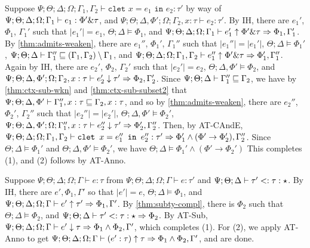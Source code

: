   \item[(T-CAndE)] Suppose
  $\Psi ; \Theta ; \Delta ; \Omega ; \Gamma_1,\Gamma_2 \vdash \texttt{clet } x = e_1 \texttt{ in } e_2 : \tau'$ by way of
  $\Psi ; \Theta ; \Delta ; \Omega ; \Gamma_1 \vdash e_1 : \Phi' \& \tau$, and
  $\Psi ; \Theta ; \Delta, \Phi' ; \Omega ; \Gamma_2, x : \tau \vdash e_2 : \tau'$.
  By IH, there are $e_1'$, $\Phi_1$, $\Gamma_1'$ such that
  $|e_1'| = e_1$,
  $\Theta ; \Delta \vDash \Phi_1$, and
  $\Psi ; \Theta ; \Delta ; \Omega ; \Gamma_1 \vdash e_1' \uparrow \Phi' \& \tau \Rightarrow \Phi_1,\Gamma_1'$.
  By \autoref{thm:admits-weaken}, there are $e_1''$, $\Phi_1'$, $\Gamma_1''$ such that
  $|e_1''| = |e_1'|$,
  $\Theta ; \Delta \vDash \Phi_1'$,
  $\Psi ; \Theta ; \Delta \vdash \Gamma_1'' \sqsubseteq (\Gamma_1,\Gamma_2) \setminus \Gamma_1$, and
  $\Psi ; \Theta ; \Delta ; \Omega ; \Gamma_1,\Gamma_2 \vdash e_1'' \uparrow \Phi' \& \tau \Rightarrow \Phi_1',\Gamma_1''$.
  Again by IH, there are $e_2'$, $\Phi_2$, $\Gamma_2'$ such that
  $|e_2'| = e_2$,
  $\Theta ; \Delta,\Phi' \vDash \Phi_2$, and
  $\Psi ; \Theta ; \Delta,\Phi' ; \Omega ; \Gamma_2,x : \tau \vdash e_2' \downarrow \tau' \Rightarrow \Phi_2,\Gamma_2'$.
  Since
  $\Psi ; \Theta ; \Delta \vdash \Gamma_1'' \sqsubseteq \Gamma_2$, we have by \autoref{thm:ctx-sub-wkn} and \autoref{thm:ctx-sub-subset2}
  that
  $\Psi ; \Theta ; \Delta,\Phi' \vdash \Gamma_1'',x : \tau \sqsubseteq \Gamma_2,x : \tau$,
  and so by \autoref{thm:admits-weaken}, there are $e_2''$, $\Phi_2'$, $\Gamma_2''$ such that
  $|e_2''| = |e_2'|$,
  $\Theta ; \Delta, \Phi' \vDash \Phi_2'$,
  $\Psi ; \Theta ; \Delta, \Phi' ; \Omega ;\Gamma_1'',x:\tau \vdash e_2'' \downarrow \tau' \Rightarrow \Phi_2',\Gamma_2''$.
  Then, by AT-CAndE,
  $\Psi ; \Theta ; \Delta ; \Omega ; \Gamma_1,\Gamma_2 \vdash \texttt{clet } x = e_1'' \texttt{ in } e_2'' : \tau' \Rightarrow \Phi_1' \wedge (\Phi' \to \Phi_2'),\Gamma_2''$.
  Since $\Theta ; \Delta \vDash \Phi_1'$ and $\Theta ; \Delta, \Phi' \vDash \Phi_2'$,
  we have $\Theta ; \Delta \vDash \Phi_1' \wedge (\Phi' \to \Phi_2')$
  This completes (1), and (2) follows by AT-Anno.
  
  \item[(T-Sub)] Suppose $\Psi ; \Theta ; \Delta ; \Omega ; \Gamma \vdash e : \tau$ from $\Psi ; \Theta ; \Delta ; \Omega ; \Gamma \vdash e : \tau'$ and $\Psi;\Theta;\Delta \vdash \tau' <: \tau : \star$. By IH, there are $e',\Phi_1,\Gamma'$ so that $|e'| = e$, $\Theta ; \Delta \vDash \Phi_1$, and $\Psi ; \Theta ; \Delta ; \Omega ; \Gamma \vdash e' \uparrow \tau' \Rightarrow \Phi_1,\Gamma'$. By \autoref{thm:subty-compl}, there is $\Phi_2$ such that $\Theta ; \Delta \vDash \Phi_2$, and $\Psi ; \Theta ; \Delta \vdash \tau' <: \tau : \star \Rightarrow \Phi_2$. By AT-Sub, $\Psi ; \Theta ; \Delta ; \Omega ; \Gamma \vdash e' \downarrow \tau \Rightarrow \Phi_1 \wedge \Phi_2,\Gamma'$, which completes (1). For (2), we apply AT-Anno to get $\Psi ; \Theta ; \Delta ; \Omega ; \Gamma \vdash (e' : \tau) \uparrow \tau \Rightarrow \Phi_1 \wedge \Phi_2,\Gamma'$, and are done.
  
